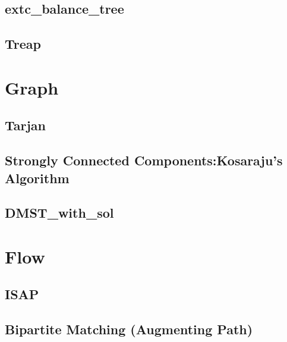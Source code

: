 \documentclass[10pt,twocolumn,oneside]{article}
\begin{document}
\subsection{extc\_balance\_tree}


\subsection{Treap}


\section{Graph}

\subsection{Tarjan}


\subsection{Strongly Connected Components:Kosaraju's Algorithm}


%

\subsection{DMST\_with\_sol}


\section{Flow}
\subsection{ISAP}


\subsection{Bipartite Matching (Augmenting Path)}

\end{document}
